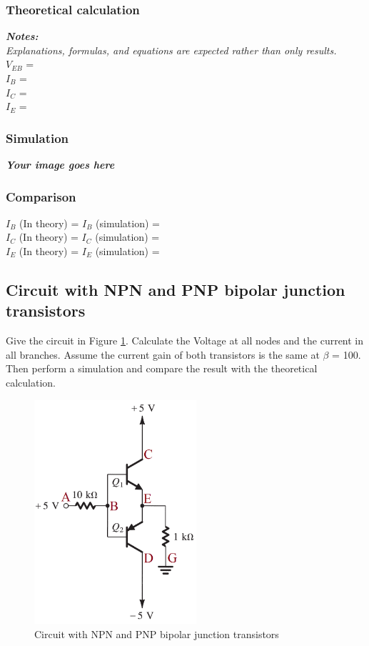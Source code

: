\subsubsection{Theoretical calculation}
\textit{\textbf{Notes:}}\\
\textit{Explanations, formulas, and equations are expected rather than only results.}
\bigskip\\

$V_{EB}$ = \dotfill\bigskip\\
$I_B$ = \dotfill\bigskip\\
$I_C$ = \dotfill\bigskip\\
$I_E$ = \dotfill\bigskip\\

\subsubsection{Simulation}
\textbf{\textit{Your image goes here}}
\vspace{8cm}

\subsubsection{Comparison}
$I_B$ (In theory) = \dotfill $I_B$ (simulation) = \dotfill\bigskip\\
$I_C$ (In theory) = \dotfill $I_C$ (simulation) = \dotfill\bigskip\\
$I_E$ (In theory) = \dotfill $I_E$ (simulation) = \dotfill\bigskip\\


\subsection{Circuit with NPN and PNP bipolar junction transistors}
Give the circuit in Figure \ref{lab3_ex7_de}. Calculate the Voltage at all nodes and the current in all branches.
Assume the current gain of both transistors is the same at $\beta$ = 100. Then perform a simulation and compare the result with the theoretical calculation.

\begin{figure}[H]
    \centering
    \includegraphics[width=6cm]{source/picture/bai_3/lab3_ex7_de.png}
    \caption{Circuit with NPN and PNP bipolar junction transistors}
    \label{lab3_ex7_de}
\end{figure}

